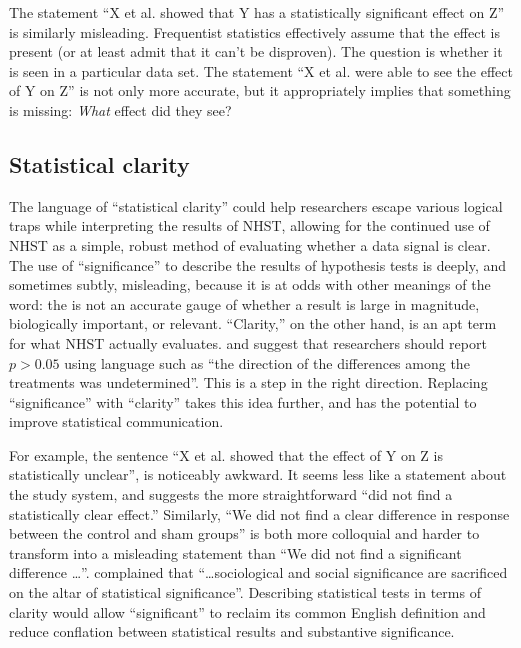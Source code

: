 The statement ``X et al. showed that Y has a statistically significant effect on Z'' is similarly misleading. Frequentist statistics effectively assume that the effect is present (or at least admit that it can't be disproven). The question is whether it is seen in a particular data set. The statement ``X et al. were able to see the effect of Y on Z'' is not only more accurate, but it appropriately implies that something is missing: \emph{What} effect did they see?

\subsection*{Statistical clarity}

\noindent The language of ``statistical clarity'' could help researchers escape various logical traps while interpreting the results of NHST, allowing for the continued use of NHST as a simple, robust method of evaluating whether a data signal is clear. The use of ``significance'' to describe the results of hypothesis tests is deeply, and sometimes subtly, misleading, because it is at odds with other meanings of the word: the \pval is not an accurate gauge of whether a result is large in magnitude, biologically important, or relevant. ``Clarity,'' on the other hand, is an apt term for what NHST actually evaluates. \citet{jones2000sensible} and \citet{robinson2001past} suggest that researchers should report $p > 0.05$ using language such as ``the direction of the differences among the treatments was undetermined''. This is a step in the right direction. Replacing ``significance'' with ``clarity'' takes this idea further, and has the potential to improve statistical communication.

For example, the sentence ``X et al. showed that the effect of Y on Z is statistically unclear'', is noticeably awkward. It seems less like a statement about the study system, and suggests the more straightforward ``did not find a statistically clear effect.'' Similarly, ``We did not find a clear difference in response between the control and sham groups'' is both more colloquial and harder to transform into a misleading statement than ``We did not find a significant difference \ldots''. \citet{Bernardietal.2017} complained that ``\ldots sociological and social significance are sacrificed on the altar of statistical significance''. Describing statistical tests in terms of clarity would allow ``significant'' to reclaim its common English definition and reduce conflation between statistical results and substantive significance.

